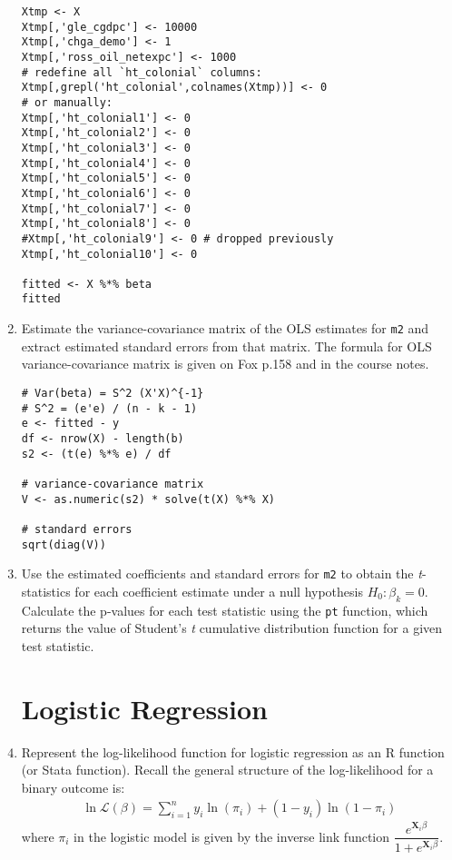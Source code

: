 \documentclass[a4paper,12pt]{article}
\newcommand{\matr}[1]{\mathbf{#1}}
\newcommand{\lik}{\mathcal{L}}
\begin{document}
\begin{enumerate}
\begin{solution}
\begin{lstlisting}
Xtmp <- X
Xtmp[,'gle_cgdpc'] <- 10000
Xtmp[,'chga_demo'] <- 1
Xtmp[,'ross_oil_netexpc'] <- 1000
# redefine all `ht_colonial` columns:
Xtmp[,grepl('ht_colonial',colnames(Xtmp))] <- 0
# or manually:
Xtmp[,'ht_colonial1'] <- 0
Xtmp[,'ht_colonial2'] <- 0
Xtmp[,'ht_colonial3'] <- 0
Xtmp[,'ht_colonial4'] <- 0
Xtmp[,'ht_colonial5'] <- 0
Xtmp[,'ht_colonial6'] <- 0
Xtmp[,'ht_colonial7'] <- 0
Xtmp[,'ht_colonial8'] <- 0
#Xtmp[,'ht_colonial9'] <- 0 # dropped previously
Xtmp[,'ht_colonial10'] <- 0

fitted <- X %*% beta
fitted
\end{lstlisting}
\end{solution}

\item Estimate the variance-covariance matrix of the OLS estimates for \texttt{m2} and extract estimated standard errors from that matrix. The formula for OLS variance-covariance matrix is given on Fox p.158 and in the course notes.

\begin{solution}
\begin{lstlisting}
# Var(beta) = S^2 (X'X)^{-1}
# S^2 = (e'e) / (n - k - 1)
e <- fitted - y
df <- nrow(X) - length(b)
s2 <- (t(e) %*% e) / df

# variance-covariance matrix
V <- as.numeric(s2) * solve(t(X) %*% X)

# standard errors
sqrt(diag(V))
\end{lstlisting}
\end{solution}

\item Use the estimated coefficients and standard errors for \texttt{m2} to obtain the \textit{t}-statistics for each coefficient estimate under a null hypothesis $H_0: \beta_k = 0$. Calculate the p-values for each test statistic using the \texttt{pt} function, which returns the value of Student's \textit{t} cumulative distribution function for a given test statistic.


\clearpage
\section{Logistic Regression}

\item Represent the log-likelihood function for logistic regression as an R function (or Stata function). Recall the general structure of the log-likelihood for a binary outcome is: 
\begin{align*}
\ln\lik(\beta) = \sum_{i=1}^{n} y_i \ln(\pi_i) + (1-y_i) \ln(1-\pi_i)
\end{align*}
where $\pi_i$ in the logistic model is given by the inverse link function $\dfrac{e^{\matr{X}_i\beta}}{1 + e^{\matr{X}_i\beta}}$.


\end{enumerate}
\end{document}
